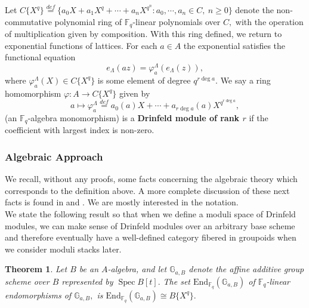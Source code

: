 \documentclass[11pt]{amsart}
\newtheorem{theorem}{Theorem}[section]
\theoremstyle{definition}
\numberwithin{equation}{section}
\newcommand{\End}{\mathrm{End}} 	%
\newcommand{\Spec}{\operatorname{Spec}} 	%
\newcommand{\bbF}{\mathbb{F}}		%
\newcommand{\bbG}{\mathbb{G}}		%
\begin{document}
		Let $C\{X^q\}\overset{def}{=}\{a_0X+a_1X^q+\cdots+a_nX^{q^n}: a_0,\cdots, a_n\in C, ~n\geq 0 \}$ denote the non-commutative polynomial ring of $\bbF_q$-linear polynomials over $C,$ with the operation of multiplication given by composition. With this ring defined, we return to exponential functions of lattices. For each $a\in A$ the exponential satisfies the functional equation 
		\[e_{\Lambda}(az)=\varphi_a^{\Lambda}(e_{\Lambda}(z)),\]
		where $\varphi_a^{\Lambda}(X)\in C\{X^q\}$ is some element of degree $q^{r\deg a}.$
		We say a ring homomorphism $\varphi: A\to C\{X^q\}$ given by \[a\mapsto \varphi_a^{\Lambda}\overset{def}{=}a_0(a)X+\cdots+a_{r\deg a}(a)X^{q^{r\deg a}},\]
		(an $\bbF_q$-algebra monomorphism) is a \textbf{Drinfeld module of rank $r$} if the coefficient with largest index is non-zero.
		
		\subsubsection{Algebraic Approach}
		
		We recall, without any proofs, some facts concerning the algebraic theory which corresponds to the definition above. A more complete discussion of these next facts is found in \cite[Definition $3.1.3$]{Papikian-Drinfeld-modules} and \cite[Lemma $3.1.4$]{Papikian-Drinfeld-modules}. We are mostly interested in the notation.\\ 
		
		We state the following result so that when we define a moduli space of Drinfeld modules, we can make sense of Drinfeld modules over an arbitrary base scheme and therefore eventually have a well-defined category fibered in groupoids when we consider moduli stacks later. 
		
		\begin{theorem}\cite[Page $65$]{Waterhouse-into-aff-grp-schemes}\label{t: endomorphisms of bbG_a}
			Let $B$ be an $A$-algebra, and let $\bbG_{a,B}$ denote the affine additive group scheme over $B$ represented by $\Spec B[t].$ The set $\End_{\bbF_q}(\bbG_{a,B})$ of $\bbF_q$-linear endomorphisms of $\bbG_{a,B},$ is 
			$\End_{\bbF_q}(\bbG_{a,B})\cong B\{X^q\}.$ 
		\end{theorem}
		
\end{document}
